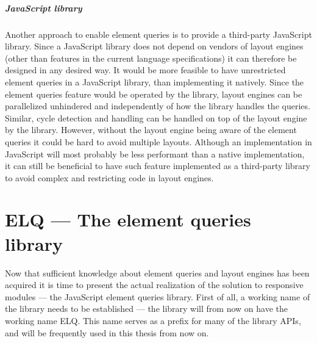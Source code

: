 \documentclass[a4paper,11pt]{kth-mag}
\begin{document}
      \paragraph{JavaScript library}
      Another approach to enable element queries is to provide a \gls{third-party} \gls{JavaScript} library.
      Since a \gls{JavaScript} library does not depend on vendors of \glspl{layout engine} (other than features in the current language specifications) it can therefore be designed in any desired way.
      It would be more feasible to have unrestricted element queries in a \gls{JavaScript} library, than implementing it natively.
      Since the element queries feature would be operated by the library, \glspl{layout engine} can be parallelized unhindered and independently of how the library handles the queries.
      Similar, cycle detection and handling can be handled on top of the \gls{layout engine} by the library.
      However, without the \gls{layout engine} being aware of the element queries it could be hard to avoid multiple layouts.
      Although an implementation in \gls{JavaScript} will most probably be less performant than a \gls{native} implementation, it can still be beneficial to have such feature implemented as a \gls{third-party} library to avoid complex and restricting code in \glspl{layout engine}.



  \chapter{ELQ --- The element queries library}\label{chp:library}
    Now that sufficient knowledge about element queries and layout engines has been acquired it is time to present the actual realization of the solution to responsive modules --- the JavaScript element queries library.
    First of all, a working name of the library needs to be established --- the library will from now on have the working name \gls{ELQ}.
    This name serves as a prefix for many of the library \glspl{API}, and will be frequently used in this thesis from now on.
    
\end{document}
